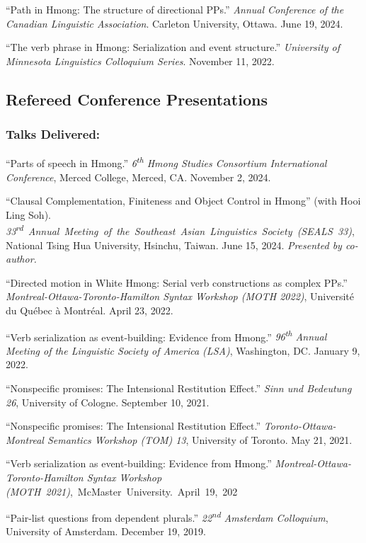 \documentclass[11pt,oneside,DIV=calc,parskip=off]{scrarticle} %
\newlength{\spacingbefore}
\newlength{\spacingafter}
\newcommand{\myonecol}[1]{%
	\vspace{\spacingbefore}%
	\begin{minipage}[t]{\linewidth}%
		\strut#1%
	\end{minipage}%
	\vspace{\spacingafter}\par%
	}
\newcommand{\talk}[1]{%
	\myonecol{#1}%
	}
\begin{document}
\talk{``Path in Hmong: The structure of directional PPs.'' \textit{Annual Conference of the Canadian Linguistic Association}. Carleton University, Ottawa. June 19, 2024.}

\talk{``The verb phrase in Hmong: Serialization and event structure.'' \textit{University of Minnesota Linguistics Colloquium Series}. November 11, 2022.}


\subsection{Refereed Conference Presentations}
\subsubsection{Talks Delivered:}
\talk{``Parts of speech in Hmong.'' \textit{6\textsuperscript{th} Hmong Studies Consortium International Conference}, Merced College, Merced, CA. November 2, 2024.}
\talk{``Clausal Complementation, Finiteness and Object Control in Hmong'' (with Hooi Ling Soh). \mbox{\textit{33\textsuperscript{rd} Annual Meeting of the Southeast Asian Linguistics Society (SEALS 33)},} National Tsing Hua University, Hsinchu, Taiwan. June 15, 2024. \emph{Presented by co-author.}} 
\talk{``Directed motion in White Hmong: Serial verb constructions as complex PPs.'' \textit{Montreal-Ottawa-Toronto-Hamilton Syntax Workshop (MOTH 2022)}, Universit\'e du Qu\'ebec \`a Montr\'eal. April 23, 2022.}
\talk{``Verb serialization as event-building: Evidence from Hmong.'' \textit{96\textsuperscript{th} Annual Meeting of the Linguistic Society of America (LSA)}, Washington, DC. January 9, 2022.}
\talk{``Nonspecific promises: The Intensional Restitution Effect.'' \textit{Sinn und Bedeutung 26}, University of Cologne. September 10, 2021.}
\talk{``Nonspecific promises: The Intensional Restitution Effect.'' \textit{Toronto-Ottawa-Montreal Semantics Workshop (TOM) 13}, University of Toronto. May 21, 2021.}
\talk{``Verb serialization as event-building: Evidence from Hmong.'' \textit{Montreal-Ottawa-Toronto-Hamilton Syntax Workshop} \mbox{\textit{(MOTH 2021)}, McMaster University. April 19, 202\rlap{1.}}}
\talk{``Pair-list questions from dependent plurals.'' \textit{22\textsuperscript{nd} Amsterdam Colloquium}, University of Amsterdam. December 19, 2019.}
\end{document}
